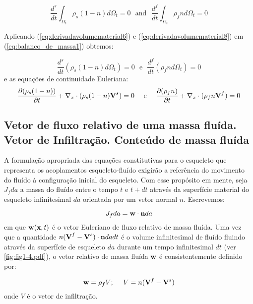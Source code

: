 \documentclass[
	11pt, %
	fleqn, %
	a4paper, %
]{LegrandOrangeBook}
\begin{document}
\begin{equation}
	\label{eq:balanco_de_massa1}	
	\dfrac{d^s}{dt}\int_{\Omega_t}\rho_s(1-n)d\Omega_t = 0~~~ \text{and}~~~\dfrac{d^f}{dt}\int_{\Omega_t}\rho_fnd\Omega_t = 0 
\end{equation}

Aplicando (\ref{eq:derivadavolumematerial6}) e (\ref{eq:derivadavolumematerial8}) em (\ref{eq:balanco_de_massa1}) obtemos:

\begin{equation}
	\label{eq:balanco_de_massa2}	
	\dfrac{d^s}{dt}(\rho_s(1-n)d\Omega_t) = 0~~~ \text{e}~~~\dfrac{d^f}{dt}(\rho_fnd\Omega_t) = 0 
\end{equation}
e as equações de continuidade Euleriana:
\begin{equation}
	\label{eq:balanco_de_massa3}	
	\dfrac{\partial(\rho_s(1-n))}{\partial t} + \nabla_x \cdot (\rho_s(1-n)\textbf{V}^s)=0 ~~~~ \text{e} ~~~~ \dfrac{\partial(\rho_fn)}{\partial t} + \nabla_x \cdot (\rho_fn\textbf{V}^f)=0
\end{equation}

\subsection{Vetor de fluxo relativo de uma massa fluída. Vetor de Infiltração. Conteúdo de massa fluída}

A formulação apropriada das equações constitutivas para o esqueleto que representa os acoplamentos esqueleto-fluído exigirão a referência do movimento do fluído à configuração inicial do esqueleto. Com esse propósito em mente, seja $J_fda$ a massa do fluído entre o tempo $t$ e $t+dt$ através da superfície material do esqueleto infinitesimal $da$ orientada por um vetor normal $n$. Escrevemos: 

\begin{equation}
	\label{eq:fluxo relativo1}	J_fda = \textbf{w} \cdot \textbf{n} da
\end{equation}
em que $\textbf{w}(\textbf{x},t)$ é o vetor Euleriano de fluxo relativo de massa fluída. Uma vez que a quantidade $n(\textbf{V}^f-\textbf{V}^s)\cdot \textbf{n} dadt$ é o volume infinitesimal de fluído fluindo através da superfície de esqueleto $da$ durante um tempo infinitesimal $dt$ (ver \autoref{fig:fig1-4.pdf}), o vetor relativo de massa fluída $\textbf{w}$ é consistentemente definido por:

\begin{equation}
	\label{eq:fluxo relativo1}	
	\textbf{w} = \rho_f V; ~~~~ V = n(\textbf{V}^f-\textbf{V}^s)
\end{equation}
onde $V$ é o vetor de infiltração. 
\end{document}
